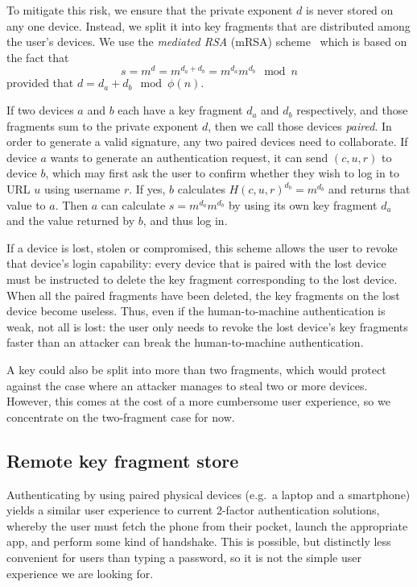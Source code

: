 To mitigate this risk, we ensure that the private exponent $d$ is never stored on any one device.
Instead, we split it into key fragments that are distributed among the user's devices. We use the
\emph{mediated RSA} (mRSA) scheme~\cite{Boneh01} which is based on the fact that
$$s = m^d = m^{d_a + d_b} = m^{d_a} m^{d_b} \mod n$$ provided that $d = d_a + d_b \mod \phi(n)$.

If two devices $a$ and $b$ each have a key fragment $d_a$ and $d_b$ respectively, and those
fragments sum to the private exponent $d$, then we call those devices \emph{paired}. In order to
generate a valid signature, any two paired devices need to collaborate. If device $a$ wants to
generate an authentication request, it can send $(c, u, r)$ to device $b$, which may first ask the
user to confirm whether they wish to log in to URL $u$ using username $r$. If yes, $b$ calculates
$H(c, u, r)^{d_b} = m^{d_b}$ and returns that value to $a$. Then $a$ can calculate
$s = m^{d_a} m^{d_b}$ by using its own key fragment $d_a$ and the value returned by $b$, and thus
log in.

If a device is lost, stolen or compromised, this scheme allows the user to revoke that device's
login capability: every device that is paired with the lost device must be instructed to delete the
key fragment corresponding to the lost device. When all the paired fragments have been deleted, the
key fragments on the lost device become useless. Thus, even if the human-to-machine authentication
is weak, not all is lost: the user only needs to revoke the lost device's key fragments faster than
an attacker can break the human-to-machine authentication.

A key could also be split into more than two fragments, which would protect against the case where
an attacker manages to steal two or more devices. However, this comes at the cost of a more
cumbersome user experience, so we concentrate on the two-fragment case for now.

\subsection{Remote key fragment store}\label{sec:fragmentstore}

Authenticating by using paired physical devices (e.g.\ a laptop and a smartphone) yields a similar
user experience to current 2-factor authentication solutions, whereby the user must fetch the phone
from their pocket, launch the appropriate app, and perform some kind of handshake. This is
possible, but distinctly less convenient for users than typing a password, so it is not the simple
user experience we are looking for.

